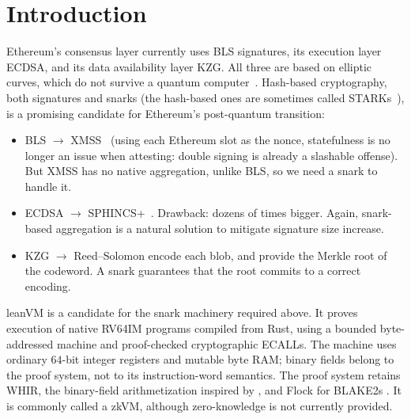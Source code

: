 \section{Introduction}\label{sec:intro}

Ethereum's consensus layer currently uses BLS signatures, its execution layer ECDSA, and its data availability layer KZG. All three are based on elliptic curves, which do not survive a quantum computer~\cite{shor}. Hash-based cryptography, both signatures and snarks (the hash-based ones are sometimes called STARKs~\cite{stark}), is a promising candidate for Ethereum's post-quantum transition:
\begin{itemize}[itemsep=1pt,topsep=3pt]
\item BLS $\to$ XMSS~\cite{rfc8391} (using each Ethereum slot as the nonce, statefulness is no longer an issue when attesting: double signing is already a slashable offense). But XMSS has no native aggregation, unlike BLS, so we need a snark to handle it.
\item ECDSA $\to$ SPHINCS+~\cite{sphincs}. Drawback: dozens of times bigger. Again, snark-based aggregation is a natural solution to mitigate signature size increase.
\item KZG $\to$ Reed--Solomon encode each blob, and provide the Merkle root of the codeword. A snark guarantees that the root commits to a correct encoding.
\end{itemize}

\vspace{4mm}

leanVM is a candidate for the snark machinery required above. It proves execution of native RV64IM programs compiled from Rust, using a bounded byte-addressed machine and proof-checked cryptographic ECALLs. The machine uses ordinary $64$-bit integer registers and mutable byte RAM; binary fields belong to the proof system, not to its instruction-word semantics. The proof system retains WHIR, the binary-field arithmetization inspired by \cite{DP24}, and Flock \cite{Flock26} for BLAKE2s \cite{blake2}. It is commonly called a zkVM, although zero-knowledge is not currently provided.
